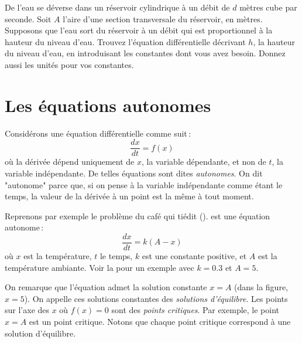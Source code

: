 \begin{exercise}
De l'eau se déverse dans un réservoir cylindrique à un débit de $d$ mètres cube par seconde.  Soit $A$ l'aire d'une section transversale du réservoir, en mètres.  Supposons que l'eau sort du réservoir à un débit qui est proportionnel à la hauteur du niveau d'eau.  Trouvez l'équation différentielle décrivant $h$, la hauteur du niveau d'eau, en introduisant les constantes dont vous avez besoin.  Donnez aussi les unités pour vos constantes.
\end{exercise}



\sectionnewpage
\section{Les équations autonomes}
\label{auteq:section}


Considérons une équation différentielle comme suit\,:  
\begin{equation*}
\frac{dx}{dt} = f(x) 
\end{equation*}
où la dérivée dépend uniquement de $x$, la variable dépendante, et non de $t$, la variable indépendante.  De telles équations sont dites \emph{autonomes}.  On dit "autonome" parce que, si on pense à la variable indépendante comme étant le temps, la valeur de la dérivée à un point est la même à tout moment.

Reprenons par exemple le problème du café qui tiédit 
().
est une équation autonome\,: 
\begin{equation*}
\frac{dx}{dt} = k (A-x) 
\end{equation*}
où $x$ est la température, $t$ le temps, $k$ est une constante positive,
et $A$ est la température ambiante.  Voir la  pour un exemple avec $k=0.3$ et $A=5$.

On remarque que l'équation admet la solution constante $x=A$ (dans la figure, $x=5$).
On appelle ces solutions constantes des 
\emph{solutions d'équilibre}.
Les points sur l'axe des $x$ où $f(x) = 0$ sont des 
\emph{points critiques}.  Par exemple, le point 
$x=A$ est un point critique. Notons que chaque point critique correspond à une solution d'équilibre. 

